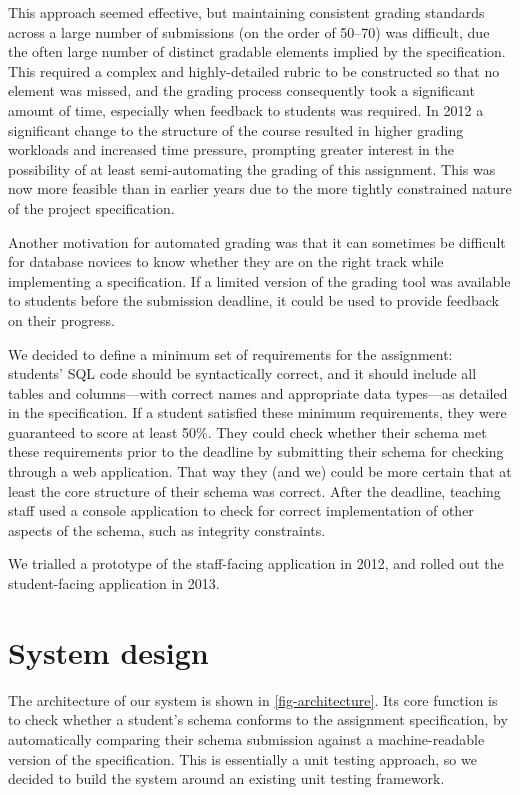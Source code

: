 \documentclass[sigconf, authordraft, capitalise]{acmart}
\begin{document}
This approach seemed effective, but maintaining consistent grading standards across a large number of submissions (on the order of 50--70) was difficult, due the often large number of distinct gradable elements implied by the specification. This required a complex and highly-detailed rubric to be constructed so that no element was missed, and the grading process consequently took a significant amount of time, especially when feedback to students was required. In 2012 a significant change to the structure of the course resulted in higher grading workloads and increased time pressure, prompting greater interest in the possibility of at least semi-automating the grading of this assignment. This was now more feasible than in earlier years due to the more tightly constrained nature of the project specification.

Another motivation for automated grading was that it can sometimes be difficult for database novices to know whether they are on the right track while implementing a specification. If a limited version of the grading tool was available to students before the submission deadline, it could be used to provide feedback on their progress.

We decided to define a minimum set of requirements for the assignment: students' SQL code should be syntactically correct, and it should include all tables and columns---with correct names and appropriate data types---as detailed in the specification. If a student satisfied these minimum requirements, they were guaranteed to score at least 50\%. They could check whether their schema met these requirements prior to the deadline by submitting their schema for checking through a web application. That way they (and we) could be more certain that at least the core structure of their schema was correct. After the deadline, teaching staff used a console application to check for correct implementation of other aspects of the schema, such as integrity constraints.

We trialled a prototype of the staff-facing application in 2012, and rolled out the student-facing application in 2013.


\section{System design}
\label{sec-design}

The architecture of our system is shown in \cref{fig-architecture}. Its core function is to check whether a student's schema conforms to the assignment specification, by automatically comparing their schema submission against a machine-readable version of the specification. This is essentially a unit testing approach, so we decided to build the system around an existing unit testing framework.
\end{document}
